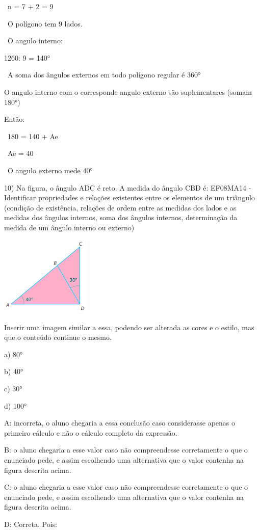 ~n = 7 + 2 = 9

~O polígono tem 9 lados.

~O angulo interno:

1260: 9 = 140°

~A soma dos ângulos externos em todo polígono regular é 360°

O angulo interno com o corresponde angulo externo são suplementares
(somam 180°)

Então:

~180 = 140 + Ae

~Ae = 40

~O angulo externo mede 40°

10) Na figura, o ângulo ADC é reto. A medida do ângulo CBD é: EF08MA14 -
Identificar propriedades e relações existentes entre os elementos de um
triângulo (condição de existência, relações de ordem entre as medidas
dos lados e as medidas dos ângulos internos, soma dos ângulos internos,
determinação da medida de um ângulo interno ou externo)

\includegraphics[width=1.68333in,height=1.49462in]{./imgSAEB_8_MAT/media/image62.png}

Inserir uma imagem similar a essa, podendo ser alterada as cores e o
estilo, mas que o conteúdo continue o mesmo.

a) 80°

b) 40°

c) 30°

d) 100°

A: incorreta, o aluno chegaria a essa conclusão caso considerasse apenas
o primeiro cálculo e não o cálculo completo da expressão.

B: o aluno chegaria a esse valor caso não compreendesse corretamente o
que o enunciado pede, e assim escolhendo uma alternativa que o valor
contenha na figura descrita acima.

C: o aluno chegaria a esse valor caso não compreendesse corretamente o
que o enunciado pede, e assim escolhendo uma alternativa que o valor
contenha na figura descrita acima.

D: Correta. Pois:

